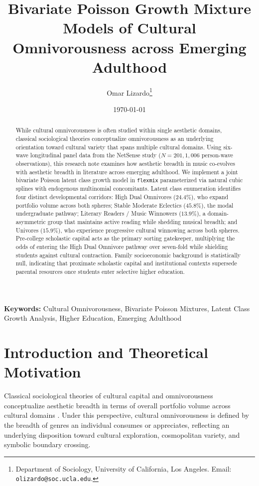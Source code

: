 \documentclass[12pt]{article}
\title{\textbf{Bivariate Poisson Growth Mixture Models of Cultural Omnivorousness across Emerging Adulthood}}
\author{Omar Lizardo\thanks{Department of Sociology, University of California, Los Angeles. Email: \texttt{olizardo@soc.ucla.edu}.}}
\date{\today}
\begin{document}
\maketitle

\begin{abstract}
While cultural omnivorousness is often studied within single aesthetic domains, classical sociological theories conceptualize omnivorousness as an underlying orientation toward cultural variety that spans multiple cultural domains. Using six-wave longitudinal panel data from the NetSense study ($N = 201, 1,006$ person-wave observations), this research note examines how aesthetic breadth in music co-evolves with aesthetic breadth in literature across emerging adulthood. We implement a joint bivariate Poisson latent class growth model in \texttt{flexmix} parameterized via natural cubic splines with endogenous multinomial concomitants. Latent class enumeration identifies four distinct developmental corridors: High Dual Omnivores ($24.4\%$), who expand portfolio volume across both spheres; Stable Moderate Eclectics ($45.8\%$), the modal undergraduate pathway; Literary Readers / Music Winnowers ($13.9\%$), a domain-asymmetric group that maintains active reading while shedding musical breadth; and Univores ($15.9\%$), who experience progressive cultural winnowing across both spheres. Pre-college scholastic capital acts as the primary sorting gatekeeper, multiplying the odds of entering the High Dual Omnivore pathway over seven-fold while shielding students against cultural contraction. Family socioeconomic background is statistically null, indicating that proximate scholastic capital and institutional contexts supersede parental resources once students enter selective higher education.
\end{abstract}

\vspace{0.8em}
\noindent\textbf{Keywords:} Cultural Omnivorousness, Bivariate Poisson Mixtures, Latent Class Growth Analysis, Higher Education, Emerging Adulthood

\section{Introduction and Theoretical Motivation}

Classical sociological theories of cultural capital and omnivorousness conceptualize aesthetic breadth in terms of overall portfolio volume across cultural domains \citep{peterson1996changing,lizardo2006cultural}. Under this perspective, cultural omnivorousness is defined by the breadth of genres an individual consumes or appreciates, reflecting an underlying disposition toward cultural exploration, cosmopolitan variety, and symbolic boundary crossing. 
\end{document}
